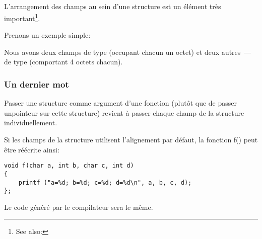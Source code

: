 ﻿\subsection{\StructurePackingSectionName}
\label{structure_packing}


L'arrangement des champs au sein d'une structure est un élément très important\footnote{See also: \URLWPDA}.

Prenons un exemple simple:



Nous avons deux champs de type \Tchar (occupant chacun un octet) et deux autres~---de type \Tint (comportant 4 octets chacun).





\subsubsection{Un dernier mot}

Passer une structure comme argument d'une fonction (plutôt que de passer unpointeur sur cette structure) 
revient à passer chaque champ de la structure individuellement.

Si les champs de la structure utilisent l'alignement par défaut, la fonction f() peut être réécrite ainsi:

\begin{lstlisting}[style=customc]
void f(char a, int b, char c, int d)
{
    printf ("a=%d; b=%d; c=%d; d=%d\n", a, b, c, d);
};
\end{lstlisting}

Le code généré par le compilateur sera le même.
